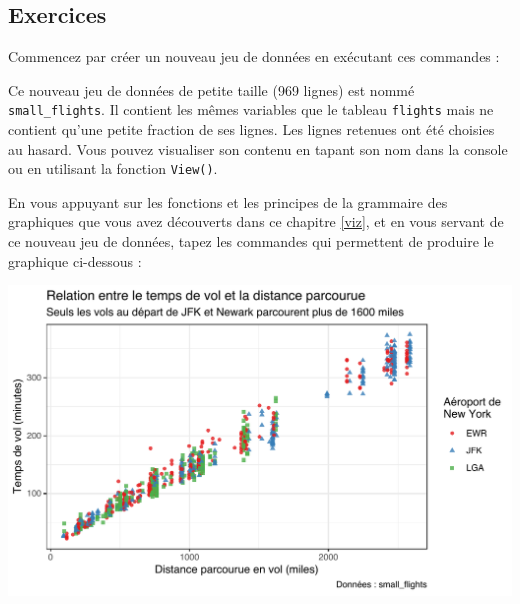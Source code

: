 \documentclass[
  a4paper,
]{article}
\newenvironment{Shaded}{\begin{snugshade}}{\end{snugshade}}
\newcommand{\DecValTok}[1]{\textcolor[rgb]{0.69,0.50,0.00}{#1}}
\newcommand{\KeywordTok}[1]{\textcolor[rgb]{0.12,0.11,0.11}{\textbf{#1}}}
\newcommand{\NormalTok}[1]{\textcolor[rgb]{0.12,0.11,0.11}{#1}}
\newcommand{\OperatorTok}[1]{\textcolor[rgb]{0.12,0.11,0.11}{#1}}
\newcommand{\StringTok}[1]{\textcolor[rgb]{0.75,0.01,0.01}{#1}}
\begin{document}
\hypertarget{exercices-6}{%
\subsection{Exercices}\label{exercices-6}}

Commencez par créer un nouveau jeu de données en exécutant ces commandes :

\begin{Shaded}
\end{Shaded}

Ce nouveau jeu de données de petite taille (969 lignes) est nommé \texttt{small\_flights}. Il contient les mêmes variables que le tableau \texttt{flights} mais ne contient qu'une petite fraction de ses lignes. Les lignes retenues ont été choisies au hasard. Vous pouvez visualiser son contenu en tapant son nom dans la console ou en utilisant la fonction \texttt{View()}.

En vous appuyant sur les fonctions et les principes de la grammaire des graphiques que vous avez découverts dans ce chapitre \ref{viz}, et en vous servant de ce nouveau jeu de données, tapez les commandes qui permettent de produire le graphique ci-dessous :

\begin{center}\includegraphics[width=0.9\linewidth]{figure/exercice-1} \end{center}
\end{document}
